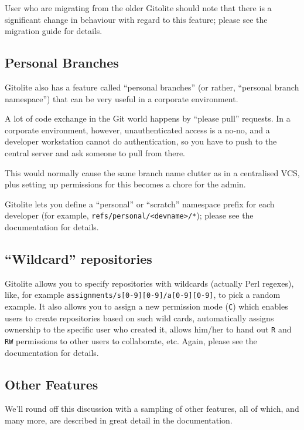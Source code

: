 \documentclass[a4paper]{book}
\begin{document}
User who are migrating from the older Gitolite should note that there is a significant change in behaviour with regard to this feature; please see the migration guide for details.

\subsection{Personal Branches}\label{personal-branches}

Gitolite also has a feature called “personal branches” (or rather, “personal branch namespace”) that can be very useful in a corporate environment.

A lot of code exchange in the Git world happens by “please pull” requests. In a corporate environment, however, unauthenticated access is a no-no, and a developer workstation cannot do authentication, so you have to push to the central server and ask someone to pull from there.

This would normally cause the same branch name clutter as in a centralised VCS, plus setting up permissions for this becomes a chore for the admin.

Gitolite lets you define a “personal” or “scratch” namespace prefix for each developer (for example, \texttt{refs/personal/\textless{}devname\textgreater{}/*}); please see the documentation for details.

\subsection{“Wildcard” repositories}\label{wildcard-repositories}

Gitolite allows you to specify repositories with wildcards (actually Perl regexes), like, for example \texttt{assignments/s{[}0-9{]}{[}0-9{]}/a{[}0-9{]}{[}0-9{]}}, to pick a random example. It also allows you to assign a new permission mode (\texttt{C}) which enables users to create repositories based on such wild cards, automatically assigns ownership to the specific user who created it, allows him/her to hand out \texttt{R} and \texttt{RW} permissions to other users to collaborate, etc. Again, please see the documentation for details.

\subsection{Other Features}\label{other-features}

We'll round off this discussion with a sampling of other features, all of which, and many more, are described in great detail in the documentation.
\end{document}
